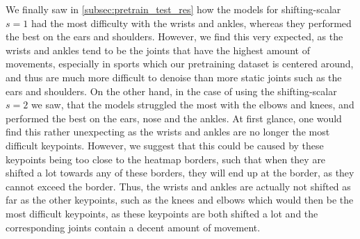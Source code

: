 \documentclass[./main.tex]{subfiles}
\begin{document}
We finally saw in \ref{subsec:pretrain_test_res} how the models for shifting-scalar $s = 1$ had the most difficulty with the wrists and ankles, whereas they performed the best on the ears and shoulders. However, we find this very expected, as the wrists and ankles tend to be the joints that have the highest amount of movements, especially in sports which our pretraining dataset is centered around, and thus are much more difficult to denoise than more static joints such as the ears and shoulders. On the other hand, in the case of using the shifting-scalar $s = 2$ we saw, that the models struggled the most with the elbows and knees, and performed the best on the ears, nose and the ankles. At first glance, one would find this rather unexpecting as the wrists and ankles are no longer the most difficult keypoints. However, we suggest that this could be caused by these keypoints being too close to the heatmap borders, such that when they are shifted a lot towards any of these borders, they will end up at the border, as they cannot exceed the border. Thus, the wrists and ankles are actually not shifted as far as the other keypoints, such as the knees and elbows which would then be the most difficult keypoints, as these keypoints are both shifted a lot and the corresponding joints contain a decent amount of movement.
\end{document}
